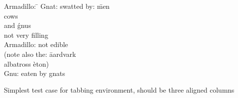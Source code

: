 \documentclass{article}
\begin{document}
\begin{table}
\begin{center}
\begin{tabbing}
Armadillo: \=							\kill
Gnat:      \> swatted by: \= men \+\+   \\
                             cows       \\
                      and \' gnus   \-  \\
              not very filling    \-    \\
Armadillo: \> not edible                \\
\pushtabs
(note also the: \= aardvark             \\
                \> albatross \` eton)   \\
\poptabs
Gnu:            \> eaten by  \>    gnats
\end{tabbing}
\caption{Simplest test case for tabbing environment, should be
three aligned columns}
\end{center}
\end{table}
\end{document}
